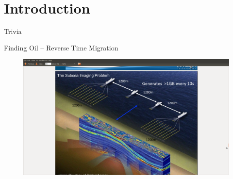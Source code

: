 \section{Introduction}

\begin{frame}{Trivia}

\end{frame}

\begin{frame}{Finding Oil -- Reverse Time Migration}
 \begin{figure}[!ht]
   \includegraphics[scale=0.22, clip=true, trim=300 50 300 120]{figs/rtm-picture.png}
  \end{figure}
\end{frame}

